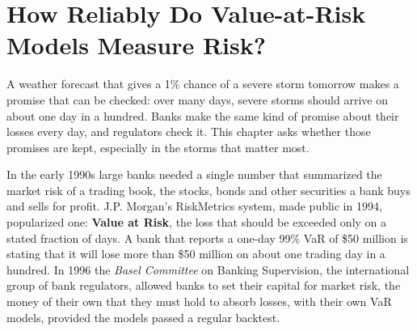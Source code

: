 \makeatletter
{}
\makeatother

\chapter{How Reliably Do Value-at-Risk Models Measure Risk?}
\label{ch:08}
\providecommand{\term}[1]{\emph{#1}}

A weather forecast that gives a 1\% chance of a severe storm tomorrow makes a promise that can be checked: over many days, severe storms should arrive on about one day in a hundred. Banks make the same kind of promise about their losses every day, and regulators check it. This chapter asks whether those promises are kept, especially in the storms that matter most.

In the early 1990s large banks needed a single number that summarized the market risk of a trading book, the stocks, bonds and other securities a bank buys and sells for profit. J.P. Morgan's RiskMetrics system, made public in 1994, popularized one: \textbf{Value at Risk}, the loss that should be exceeded only on a stated fraction of days. A bank that reports a one-day 99\% VaR of \$50 million is stating that it will lose more than \$50 million on about one trading day in a hundred. In 1996 the \term{Basel Committee} on Banking Supervision, the international group of bank regulators, allowed banks to set their capital for market risk, the money of their own that they must hold to absorb losses, with their own VaR models, provided the models passed a regular backtest.


